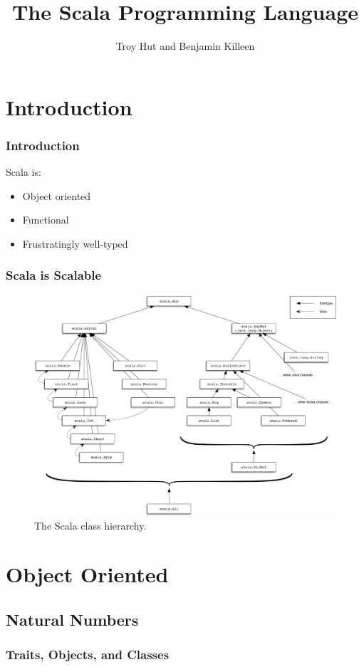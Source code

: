 \documentclass[10pt, usenames, dvipsnames, table]{beamer}
\title{The Scala Programming Language}
\author{Troy Hut and Benjamin Killeen}
\date{}
\begin{document}
\begin{frame}
  \titlepage{}
\end{frame}

\section{Introduction}
\begin{frame}
  \frametitle{Introduction}
  Scala is:
  \begin{itemize}
  \item<2-> Object oriented
  \item<3-> Functional
  \item<4-> Frustratingly well-typed
  \end{itemize}
\end{frame}

\begin{frame}
  \frametitle{Scala is \textbf{Scalable}}
  \begin{figure}
    \centering
    \includegraphics[width=0.8\linewidth]{scala_classes}
    \caption{The Scala class hierarchy.}
    \label{fig:class_hierarchy}
  \end{figure}
\end{frame}

\section{Object Oriented}

\subsection{Natural Numbers}
\begin{frame}
  \frametitle{Traits, Objects, and Classes}
  \inputminted{Scala}{../examples/ExampleNat.scala}
  \pause{}
  \inputminted{Scala}{../examples/ExampleZero.scala}
  \pause{}
  \inputminted{Scala}{../examples/ExampleSucc.scala}  
\end{frame}
\end{document}
